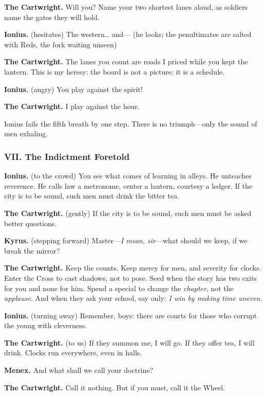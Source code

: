 \documentclass[11pt]{article}
\begin{document}
\noindent\textbf{The Cartwright.} Will you? Name your two shortest lanes aloud, as soldiers name the gates they will hold.

\noindent\textbf{Ionius.} (hesitates) The western… and— (he looks; the penultimates are salted with Reds, the fork waiting unseen)

\noindent\textbf{The Cartwright.} The lanes you count are roads I priced while you kept the lantern. This is my heresy: the board is not a picture; it is a schedule.

\noindent\textbf{Ionius.} (angry) You play against the spirit!

\noindent\textbf{The Cartwright.} I play against the hour.

Ionius fails the fifth breath by one step. There is no triumph—only the sound of men exhaling.

\medskip
\subsubsection*{VII. The Indictment Foretold}
\noindent\textbf{Ionius.} (to the crowd) You see what comes of learning in alleys. He unteaches reverence. He calls law a metronome, center a lantern, courtesy a ledger. If the city is to be sound, such men must drink the bitter tea.

\noindent\textbf{The Cartwright.} (gently) If the city is to be sound, such men must be asked better questions.

\noindent\textbf{Kyrus.} (stepping forward) Master—\emph{I mean, sir}—what should we keep, if we break the mirror?

\noindent\textbf{The Cartwright.} Keep the counts. Keep mercy for men, and severity for clocks. Enter the Cross to cast shadows, not to pose. Seed when the story has two exits for you and none for him. Spend a special to change the \emph{chapter}, not the \emph{applause}. And when they ask your school, say only: \emph{I win by making time uneven.}

\noindent\textbf{Ionius.} (turning away) Remember, boys: there are courts for those who corrupt the young with cleverness.

\noindent\textbf{The Cartwright.} (to us) If they summon me, I will go. If they offer tea, I will drink. Clocks run everywhere, even in halls.

\noindent\textbf{Menex.} And what shall we call your doctrine?

\noindent\textbf{The Cartwright.} Call it nothing. But if you must, call it the Wheel.
\end{document}
